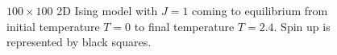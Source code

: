 \documentclass{article}
\begin{document}
\begin{figure} \ContinuedFloat
\hspace{0mm}
\caption{$100 \times 100$ 2D Ising model with $J=1$ coming to equilibrium from
initial temperature $T = 0$ to final temperature $T = 2.4$. Spin up is represented
by black squares. }
\end{figure}
\end{document}
